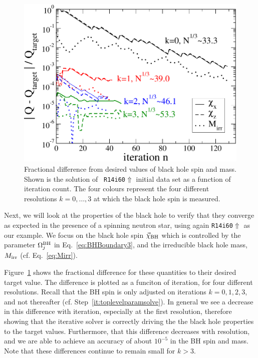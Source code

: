 \begin{figure}
  \centerline{\includegraphics[scale=0.95]{chap4/BHSpinConv}}
\caption[Convergence of black hole spin and mass.]
{\label{Fig:BHSpinConv}Fractional difference from desired values of
  black hole spin and mass. Shown is the solution of {\tt
    R14i60$\Uparrow$} initial data set as a function of iteration
  count. The four colours represent the four different resolutions
  $k=0,\ldots,3$ at which the black hole spin is measured. }
\end{figure}

Next, we will look at the properties of the black hole to verify that
they converge as expected in the presence of a spinning neutron star,
using again {\tt R14i60$\Uparrow$} as our example. We focus on the
black hole spin $\vec\chi_{\rm BH}$ which is controlled by the
parameter $\Omega_j^{\rm BH}$ in Eq.~\ref{eq:BHBoundary3}, and the
irreducible black hole mass, $M_{\rm irr}$ (cf. Eq.~\ref{eq:Mirr}).

Figure~\ref{Fig:BHSpinConv} shows the fractional difference for these quantities to their desired target value.
 The
difference is plotted as a funciton of iteration, for four different
resolutions. Recall that the BH spin is only adjusted on iterations $k=0,1,2,3$, and not thereafter (cf. Step~\ref{it:toplevelparamsolve}). In general we see a decrease in this difference with iteration, especially at the first resolution, therefore showing that the iterative solver is correctly driving the the black hole properties to the target values.
Furthermore, that this difference decreases with resolution, and
we are able to achieve an accuracy of about $10^{-5}$ in the BH spin
and mass. Note that these differences continue to remain small for $k>3$.

